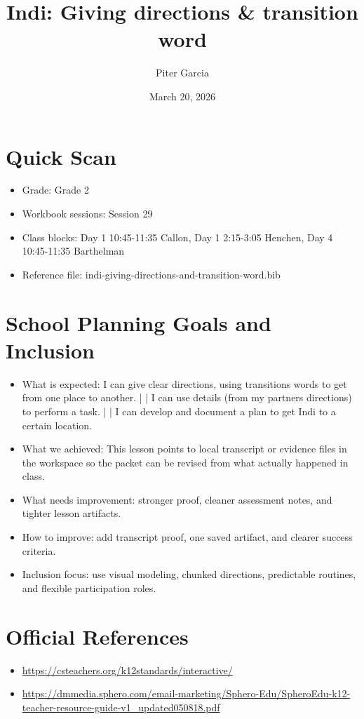 \documentclass[11pt]{article}
\title{Indi: Giving directions & transition word}
\author{Piter Garcia}
\date{March 20, 2026}
\begin{document}
    \maketitle
    \section*{Quick Scan}
    \begin{itemize}[leftmargin=*]
    \item Grade: Grade 2
    \item Workbook sessions: Session 29
    \item Class blocks: Day 1 10:45-11:35 Callon, Day 1 2:15-3:05 Henchen, Day 4 10:45-11:35 Barthelman
    \item Reference file: indi-giving-directions-and-transition-word.bib
    \end{itemize}
    \section*{School Planning Goals and Inclusion}
    \begin{itemize}[leftmargin=*]
    \item What is expected: I can give clear directions, using transitions words to get from one place to another. | | I can use details (from my partners directions) to perform a task. | | I can develop and document a plan to get Indi to a certain location.
    \item What we achieved: This lesson points to local transcript or evidence files in the workspace so the packet can be revised from what actually happened in class.
    \item What needs improvement: stronger proof, cleaner assessment notes, and tighter lesson artifacts.
    \item How to improve: add transcript proof, one saved artifact, and clearer success criteria.
    \item Inclusion focus: use visual modeling, chunked directions, predictable routines, and flexible participation roles.
    \end{itemize}
    \section*{Official References}
    \begin{itemize}[leftmargin=*]
    \item \url{https://csteachers.org/k12standards/interactive/}
\item \url{https://dmmedia.sphero.com/email-marketing/Sphero-Edu/SpheroEdu-k12-teacher-resource-guide-v1_updated050818.pdf}

    \end{itemize}
    
\end{document}
